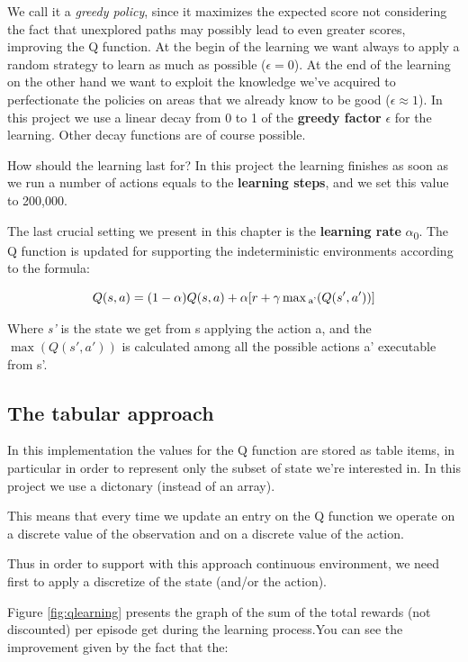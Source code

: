 \documentclass{article}
\begin{document}
We call it a \emph{greedy policy}, since it maximizes the expected score not considering the fact that unexplored paths may
possibly lead to even greater scores, improving the Q function.
At the begin of the learning we want always to apply a random strategy to learn as much as possible ($\epsilon = 0$).
At the end of the learning on the other hand we want to exploit the knowledge we've acquired to perfectionate the policies on areas
that we already know to be good ($\epsilon \approx 1$).
In this project we use a linear decay from 0 to 1 of the \textbf{greedy factor} $\epsilon$ for the learning.
Other decay functions are of course possible.

How should the learning last for? In this project the learning finishes as soon as we run a number of actions
equals to the \textbf{learning steps}, and we set this value to 200,000.

The last crucial setting we present in this chapter is the \textbf{learning rate} $\alpha$\textsubscript{0}.
The Q function is updated for supporting the indeterministic environments according to the formula:

\begin{equation}
  Q(s,a) = (1 - \alpha) Q(s,a) + \alpha [r + \gamma \max\textsubscript{a'} (Q(s',a'))]
\end{equation}

Where \emph{s'} is the state we get from s applying the action a, 
and the $\max (Q(s',a'))$ is calculated among all the possible actions a' executable from s'.

\subsection{The tabular approach}

In this implementation the values for the Q function are stored as table items,
in particular in order to represent only the subset of state we're interested in.  
In this project we use a dictonary (instead of an array).

This means that every time we update an entry on the Q function we operate on a discrete value of the
observation and on a discrete value of the action.

Thus in order to support with this approach continuous environment,
we need first to apply a discretize of the state (and/or the action).

Figure \ref{fig:qlearning} presents the graph of the sum of the total rewards (not discounted) per episode get 
during the learning process.You can see the improvement given by the fact that the:
\end{document}
